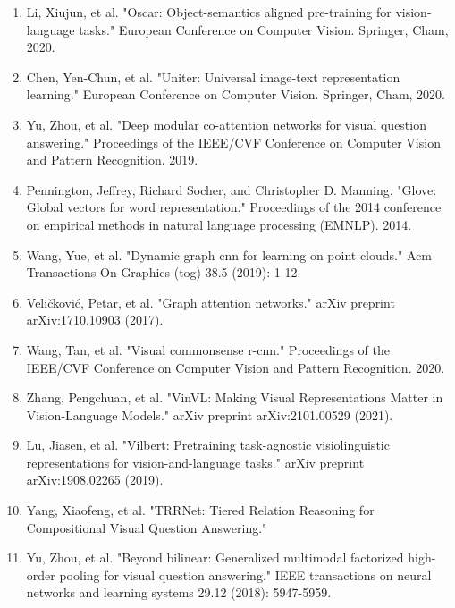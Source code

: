 \documentclass{article}
\begin{document}
\begin{enumerate}
    \item Li, Xiujun, et al. "Oscar: Object-semantics aligned pre-training for vision-language tasks." European Conference on Computer Vision. Springer, Cham, 2020.
    \item Chen, Yen-Chun, et al. "Uniter: Universal image-text representation learning." European Conference on Computer Vision. Springer, Cham, 2020.
    \item Yu, Zhou, et al. "Deep modular co-attention networks for visual question answering." Proceedings of the IEEE/CVF Conference on Computer Vision and Pattern Recognition. 2019.
    \item Pennington, Jeffrey, Richard Socher, and Christopher D. Manning. "Glove: Global vectors for word representation." Proceedings of the 2014 conference on empirical methods in natural language processing (EMNLP). 2014.
    \item Wang, Yue, et al. "Dynamic graph cnn for learning on point clouds." Acm Transactions On Graphics (tog) 38.5 (2019): 1-12.
    \item Veličković, Petar, et al. "Graph attention networks." arXiv preprint arXiv:1710.10903 (2017).
    \item Wang, Tan, et al. "Visual commonsense r-cnn." Proceedings of the IEEE/CVF Conference on Computer Vision and Pattern Recognition. 2020.
    \item Zhang, Pengchuan, et al. "VinVL: Making Visual Representations Matter in Vision-Language Models." arXiv preprint arXiv:2101.00529 (2021).
    \item Lu, Jiasen, et al. "Vilbert: Pretraining task-agnostic visiolinguistic representations for vision-and-language tasks." arXiv preprint arXiv:1908.02265 (2019).
    \item Yang, Xiaofeng, et al. "TRRNet: Tiered Relation Reasoning for Compositional Visual Question Answering."
    \item Yu, Zhou, et al. "Beyond bilinear: Generalized multimodal factorized high-order pooling for visual question answering." IEEE transactions on neural networks and learning systems 29.12 (2018): 5947-5959.

\end{enumerate}
\end{document}
